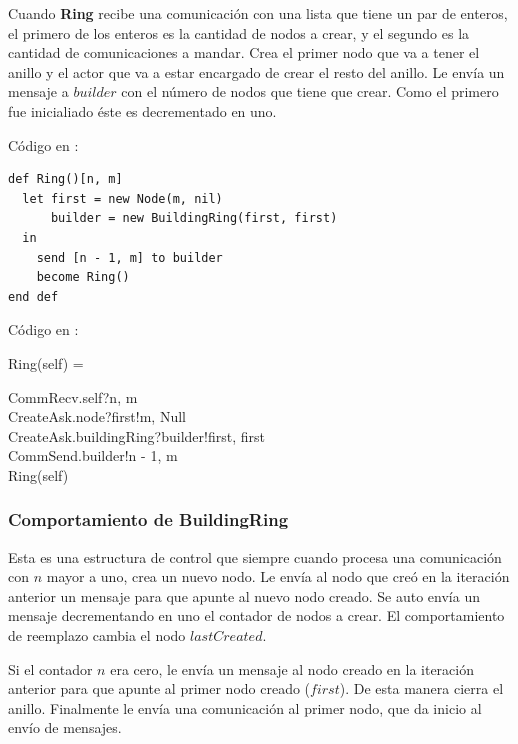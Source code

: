 Cuando \textbf{Ring} recibe una comunicación con una lista que tiene un par de enteros, el primero de los enteros es la cantidad de nodos a crear, y el segundo es la cantidad de comunicaciones a mandar. Crea el primer nodo que va a tener el anillo y el actor que va a estar encargado de crear el resto del anillo. Le envía un mensaje a $builder$ con el número de nodos que tiene que crear. Como el primero fue inicialiado éste es decrementado en uno.

Código en \SAL:

\begin{lstlisting}[language=sal, style=simple]
def Ring()[n, m]
  let first = new Node(m, nil)
      builder = new BuildingRing(first, first) 
  in
    send [n - 1, m] to builder
    become Ring() 
end def
\end{lstlisting}

Código en \CSP:

\begin{process}
Ring(self) = \\ \quad
  \begin{block}
  CommRecv.self?\langle n, m \rangle \then \\
  CreateAsk.node?first!\langle m, Null \rangle \then \\
  CreateAsk.buildingRing?builder!\langle first, first \rangle \then \\
  CommSend.builder!\langle n - 1, m\rangle \then \\
  Ring(self)
  \end{block}
\end{process}

\subsubsection*{Comportamiento de BuildingRing}

Esta es una estructura de control que siempre cuando procesa una comunicación con $n$ mayor a uno, crea un nuevo nodo. Le envía al nodo que creó en la iteración anterior un mensaje para que apunte al nuevo nodo creado. Se auto envía un mensaje decrementando en uno el contador de nodos a crear. El comportamiento de reemplazo cambia el nodo $lastCreated$.

Si el contador $n$ era cero, le envía un mensaje al nodo creado en la iteración anterior para que apunte al primer nodo creado ($first$). De esta manera cierra el anillo. Finalmente le envía una comunicación al primer nodo, que da inicio al envío de mensajes. 

